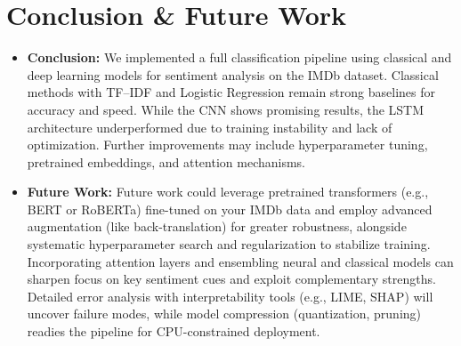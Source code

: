 \documentclass[12pt,a4paper]{article}
\begin{document}
\section{Conclusion \& Future Work}
\begin{itemize}
\item \textbf{Conclusion:} We implemented a full classification pipeline using classical and deep learning models for sentiment analysis on the IMDb dataset. Classical methods with TF–IDF and Logistic Regression remain strong baselines for accuracy and speed. While the CNN shows promising results, the LSTM architecture underperformed due to training instability and lack of optimization. Further improvements may include hyperparameter tuning, pretrained embeddings, and attention mechanisms.
\item \textbf{Future Work:} Future work could leverage pretrained transformers (e.g., BERT or RoBERTa) fine-tuned on your IMDb data and employ advanced augmentation (like back-translation) for greater robustness, alongside systematic hyperparameter search and regularization to stabilize training. Incorporating attention layers and ensembling neural and classical models can sharpen focus on key sentiment cues and exploit complementary strengths. Detailed error analysis with interpretability tools (e.g., LIME, SHAP) will uncover failure modes, while model compression (quantization, pruning) readies the pipeline for CPU-constrained deployment.
\end{itemize}
\end{document}
